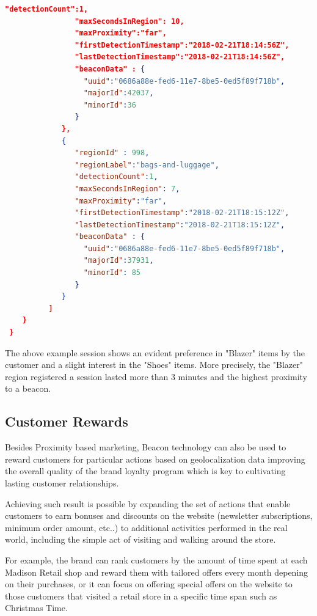 \begin{lstlisting}[language=json,firstnumber=1]
                "detectionCount":1,
                "maxSecondsInRegion": 10,
                "maxProximity":"far",
                "firstDetectionTimestamp":"2018-02-21T18:14:56Z",
                "lastDetectionTimestamp":"2018-02-21T18:14:56Z",
                "beaconData" : {
                  "uuid":"0686a88e-fed6-11e7-8be5-0ed5f89f718b",
                  "majorId":42037,
                  "minorId":36
                }
             },
             {
                "regionId" : 998,
                "regionLabel":"bags-and-luggage",
                "detectionCount":1,
                "maxSecondsInRegion": 7,
                "maxProximity":"far",
                "firstDetectionTimestamp":"2018-02-21T18:15:12Z",
                "lastDetectionTimestamp":"2018-02-21T18:15:12Z",
                "beaconData" : {
                  "uuid":"0686a88e-fed6-11e7-8be5-0ed5f89f718b",
                  "majorId":37931,
                  "minorId": 85
                }
             }
          ]
    }
 }
  \end{lstlisting}
\vspace{0.5cm}


The above example session shows an evident preference in "Blazer" items by the customer and a slight interest in the "Shoes" items. More precisely, the "Blazer" region registered a session lasted more than 3 minutes and the highest proximity to a beacon.  

\subsection{Customer Rewards}

Besides Proximity based marketing, Beacon technology can also be used to reward customers for particular actions based on geolocalization data improving the overall quality of the brand loyalty program which is key to cultivating lasting customer relationships. 

Achieving such result is possible by expanding the set of actions that enable customers to earn bonuses and discounts on the website (newsletter subscriptions, minimum order amount, etc..) to additional activities performed in the real world, including the simple act of visiting and walking around the store.

For example, the brand can rank customers by the amount of time spent at each Madison Retail shop and reward them with tailored offers every month depening on their purchases, or it can focus on offering special offers on the website to those customers that visited a retail store in a specific time span such as Christmas Time.

